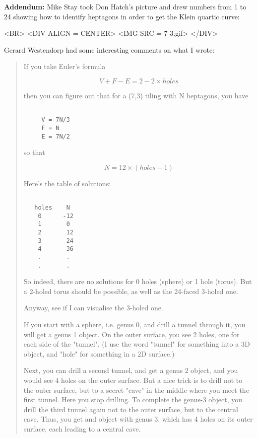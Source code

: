 \textbf{Addendum:}
Mike Stay took Don Hatch's picture and drew numbers
from 1 to 24 showing how to identify heptagons in order 
to get the Klein quartic curve:

<BR>
<DIV ALIGN = CENTER>
<IMG SRC = 7-3.gif>
</DIV>

Gerard Westendorp had some interesting comments on what
I wrote:

\begin{quote}
If you take Euler's formula

$$

     V+F-E = 2-2\times holes
$$
    
then you can figure out that for a (7,3) tiling with N heptagons,
you have

\begin{verbatim}

     V = 7N/3
     F = N
     E = 7N/2
\end{verbatim}
    
so that

$$

     N = 12\times (holes-1)
$$
    
Here's the table of solutions:

\begin{verbatim}

   holes    N
    0      -12
    1       0
    2       12
    3       24
    4       36
    .       . 
    .       . 
\end{verbatim}
    
So indeed, there are no solutions for 0 holes (sphere)
or 1 hole (torus).  But a 2-holed torus should be possible,
as well as the 24-faced 3-holed one.

Anyway, see if I can visualise the 3-holed one.

If you start with a sphere, i.e. genus 0, and drill
a tunnel through it, you will get a genus 1 object. On
the outer surface, you see 2 holes, one for each side
of the "tunnel". (I use the word "tunnel"
for something into a 3D object, and "hole" for something
in a 2D surface.)

Next, you can drill a second tunnel, and get a genus 2 object,
and you would see 4 holes on the outer surface.
But a nice trick is to drill not to the outer surface,
but to a secret "cave" in the middle where you meet the
first tunnel. Here you stop drilling. To complete
the genus-3 object, you drill the third tunnel again not
to the outer surface, but to the central cave. Thus, you
get and object with genus 3, which has 4 holes on its
outer surface, each leading to a central cave.


\end{quote}
